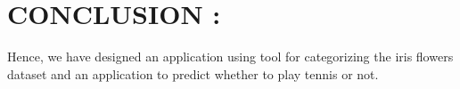 \documentclass[10pt,a4paper]{article}
\begin{document}
\begin{itemize}
\begin{center}
	\begin{figure}[!htbp]
		\centering
	\end{figure}
\end{center} 

\begin{center}
	\begin{figure}[!htbp]
		\centering
	\end{figure}
\end{center} 

\begin{center}
	\begin{figure}[!htbp]
	\end{figure}
\end{center} 
\end{itemize}

\newpage			
\section{CONCLUSION : }
	Hence, we have designed an application using tool for categorizing the iris flowers dataset and an application to predict whether to play tennis or not. 
\end{document}
